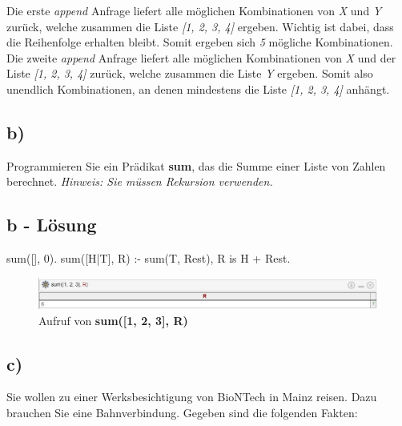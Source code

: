 \newline
Die erste \textit{append} Anfrage liefert alle möglichen Kombinationen von \textit{X} und \textit{Y} zurück, welche zusammen
die Liste \textit{[1, 2, 3, 4]} ergeben.
Wichtig ist dabei, dass die Reihenfolge erhalten bleibt.
Somit ergeben sich \textit{5} mögliche Kombinationen.
\newline
Die zweite \textit{append} Anfrage liefert alle möglichen Kombinationen von \textit{X} und der Liste \textit{[1, 2, 3, 4]} zurück,
welche zusammen die Liste \textit{Y} ergeben.
Somit also unendlich Kombinationen, an denen mindestens die Liste \textit{[1, 2, 3, 4]} anhängt.

\subsection*{b)}
Programmieren Sie ein Prädikat \textbf{sum}, das die Summe einer Liste von Zahlen berechnet.
\textit{Hinweis: Sie müssen Rekursion verwenden.}
\newline

\subsection*{b - Lösung}
\newline
\begin{code}[language=prolog, caption={Sum}, label={lst:Aufgabe5b}]
sum([], 0).
sum([H|T], R) :-
   sum(T, Rest),
   R is H + Rest.
\end{code}
\newline
\begin{figure}[h]
    \centering
	\includegraphics[width=\textwidth]{media/Aufgabe5b_sum}
	\caption{Aufruf von \textbf{sum([1, 2, 3], R)}}
	\label{img:Aufgabe5b_sum}
\end{figure}
\newline

\subsection*{c)}
Sie wollen zu einer Werksbesichtigung von BioNTech in Mainz reisen. Dazu brauchen Sie eine Bahnverbindung. Gegeben sind die folgenden Fakten:

